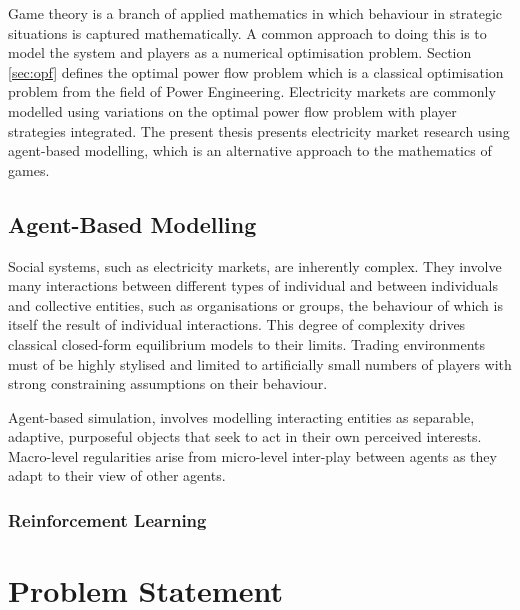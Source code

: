 Game theory is a branch of applied mathematics in which behaviour in strategic
situations is captured mathematically.  A common approach to doing this is to
model the system and players as a numerical optimisation problem.  Section
\ref{sec:opf} defines the optimal power flow problem which is a classical
optimisation problem from the field of Power Engineering.  Electricity markets
are commonly modelled using variations on the optimal power flow problem with
player strategies integrated.  The present thesis presents electricity market
research using agent-based modelling, which is an alternative approach to the
mathematics of games.

\subsection{Agent-Based Modelling}
Social systems, such as electricity markets, are inherently complex.  They
involve many interactions between different types of individual and between
individuals and collective entities, such as organisations or groups, the
behaviour of which is itself the result of individual interactions.  This
degree of complexity drives classical closed-form equilibrium models to their
limits.  Trading environments must of be highly stylised and limited to
artificially small numbers of players with strong constraining assumptions on
their behaviour.

Agent-based simulation, involves modelling interacting entities as separable,
adaptive, purposeful objects that seek to act in their own perceived interests.
Macro-level regularities arise from micro-level inter-play between agents as
they adapt to their view of other agents.

\subsubsection{Reinforcement Learning}

\section{Problem Statement}%

